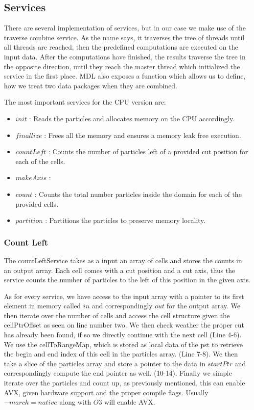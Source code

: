 \documentclass[]{article}
\begin{document}
\subsection{Services}


There are several implementation of services, but in our case we make use of the traverse combine service. As the name says, it traverses the tree of threads until all threads are reached, then the predefined computations are executed on the input data. After the computations have finished, the results traverse the tree in the opposite direction, until they reach the master thread which initialized the service in the first place. MDL also exposes a function which allows us to define, how we treat two data packages when they are combined.

The most important services for the CPU version are:


\begin{itemize}
	\item $init$ : Reads the particles and allocates memory on the CPU accordingly.
	\item $finallize$ : Frees all the memory and ensures a memory leak free execution.  
	\item $countLeft$ : Counts the number of particles left of a provided cut position for each of the cells.
	\item $makeAxis$ : 
	\item $count$ : Counts the total number particles inside the domain for each of the provided cells.
	\item $partition$ : Partitions the particles to preserve memory locality.
\end{itemize}




\subsubsection{Count Left}

The countLeftService takes as a input an array of cells and stores the counts in an output array. Each cell comes with a cut position and a cut axis, thus the service counts the number of particles to the left of this position in the given axis. 

As for every service, we have access to the input array with a pointer to its first element in memory called $in$ and correspondingly $out$ for the output array. We then iterate over the number of cells and access the cell structure given the cellPtrOffset as seen on line number two.
We then check weather the proper cut has already been found, if so we directly continue with the next cell (Line 4-6). We use the cellToRangeMap, which is stored as local data of the pst to retrieve the begin and end index of this cell in the particles array. (Line 7-8).
We then take a slice of the particles array and store a pointer to the data in $startPtr$ and correspondingly compute the end pointer as well. (10-14).
Finally we simple iterate over the particles and count up, as previously mentioned, this can enable AVX, given hardware support and the proper compile flags. Usually $-march=native$ along with $O3$ will enable AVX. 
\end{document}
